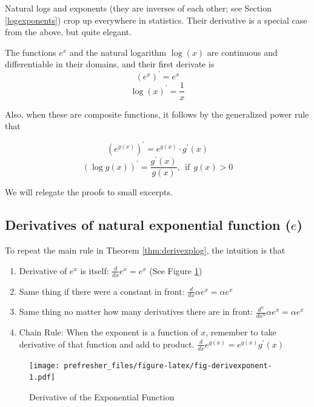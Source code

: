 \documentclass[]{book}
\providecommand{\tightlist}{%
  \setlength{\itemsep}{0pt}\setlength{\parskip}{0pt}}
\theoremstyle{definition}
\theoremstyle{definition}
\theoremstyle{definition}
\theoremstyle{remark}
\let\BeginKnitrBlock\begin \let\EndKnitrBlock\end
\begin{document}
Natural logs and exponents (they are inverses of each other; see Section \ref{logexponents}) crop up everywhere in statistics. Their derivative is a special case from the above, but quite elegant.

\BeginKnitrBlock{theorem}
\protect\hypertarget{thm:derivexplog}{}{\label{thm:derivexplog} }
The functions \(e^x\) and the natural logarithm \(\log(x)\) are continuous and differentiable in their domains, and their first derivate is
\[(e^x)^\prime = e^x\]
\[\log(x)^\prime = \frac{1}{x}\]

Also, when these are composite functions, it follows by the generalized power rule that

\[\left(e^{g(x)}\right)^\prime = e^{g(x)} \cdot g^\prime(x)\]
\[\left(\log g(x)\right)^\prime = \frac{g^\prime(x)}{g(x)}, ~~\text{if}~~ g(x) > 0\]
\EndKnitrBlock{theorem}

We will relegate the proofs to small excerpts.

\hypertarget{derivatives-of-natural-exponential-function-e}{%
\subsection*{\texorpdfstring{Derivatives of natural exponential function (\(e\))}{Derivatives of natural exponential function (e)}}\label{derivatives-of-natural-exponential-function-e}}

To repeat the main rule in Theorem \ref{thm:derivexplog}, the intuition is that

\begin{enumerate}
\def\labelenumi{\arabic{enumi}.}
\tightlist
\item
  Derivative of \(e^x\) is itself: \(\frac{d}{dx}e^x = e^x\) (See Figure \ref{fig:fig-derivexponent})
\item
  Same thing if there were a constant in front: \(\frac{d}{dx}\alpha e^x = \alpha e^x\)
\item
  Same thing no matter how many derivatives there are in front: \(\frac{d^n}{dx^n} \alpha e^x = \alpha e^x\)
\item
  Chain Rule: When the exponent is a function of \(x\), remember to take derivative of that function and add to product. \(\frac{d}{dx}e^{g(x)}= e^{g(x)} g^\prime(x)\)
\end{enumerate}

\begin{figure}
\centering
\texttt{[image: prefresher\_files/figure-latex/fig-derivexponent-1.pdf]}
\caption{\label{fig:fig-derivexponent}Derivative of the Exponential Function}
\end{figure}
\end{document}
